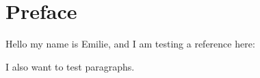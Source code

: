\chapter{Preface}\label{ch:preface}
Hello my name is Emilie, and I am testing a reference here: \cite{Madsen2013} \cite{Madsen2012} \cite{Damala2008} \cite{Jung2016} \cite{Rattanarungrot2015}

I also want to test paragraphs.